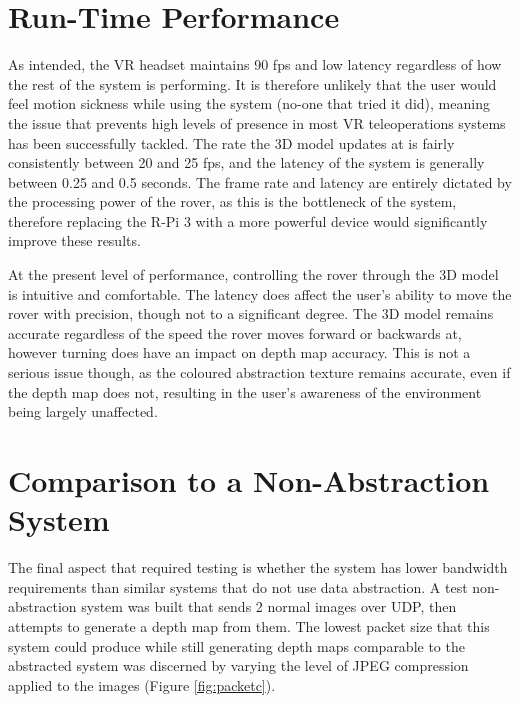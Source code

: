 \section{Run-Time Performance}

As intended, the VR headset maintains 90 fps and low latency regardless of how the rest of the system is performing. It is therefore unlikely that the user would feel motion sickness while using the system (no-one that tried it did), meaning the issue that prevents high levels of presence in most VR teleoperations systems has been successfully tackled. The rate the 3D model updates at is fairly consistently between 20 and 25 fps, and the latency of the system is generally between 0.25 and 0.5 seconds. The frame rate and latency are entirely dictated by the processing power of the rover, as this is the bottleneck of the system, therefore replacing the R-Pi 3 with a more powerful device would significantly improve these results.

At the present level of performance, controlling the rover through the 3D model is intuitive and comfortable. The latency does affect the user's ability to move the rover with precision, though not to a significant degree. The 3D model remains accurate regardless of the speed the rover moves forward or backwards at, however turning does have an impact on depth map accuracy. This is not a serious issue though, as the coloured abstraction texture remains accurate, even if the depth map does not, resulting in the user's awareness of the environment being largely unaffected.

\section{Comparison to a Non-Abstraction System}

The final aspect that required testing is whether the system has lower bandwidth requirements than similar systems that do not use data abstraction. A test non-abstraction system was built that sends 2 normal images over UDP, then attempts to generate a depth map from them. The lowest packet size that this system could produce while still generating depth maps comparable to the abstracted system was discerned by varying the level of JPEG compression applied to the images (Figure \ref{fig:packetc}).

